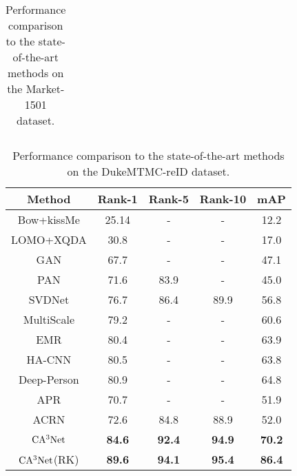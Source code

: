 \documentclass[sigconf]{acmart}
\begin{document}
\begin{table}[htbp]
\begin{center}
\begin{tabular}{|c|c|c|c|c|}
			\hline
		\end{tabular}
	\end{center}
	\caption{Performance comparison to the state-of-the-art methods on the Market-1501 dataset.}
\end{table}\begin{table}[htbp]
	\begin{center}
		\newcommand{\tabincell}[2]{\begin{tabular}{@{}#1@{}}#2\end{tabular}}
		\begin{tabular}{|c|c|c|c|c|}
			\hline
			\textbf{Method}&\textbf{Rank-1}&\textbf{Rank-5}&\textbf{Rank-10}&\textbf{mAP}\\
			\hline
			Bow+kissMe\cite{17}&25.14&-&-&12.2\\
			\hline
			LOMO+XQDA\cite{2}&30.8&-&-&17.0\\
			\hline
			\hline
			GAN\cite{18}&67.7&-&-&47.1\\
			\hline
			PAN\cite{28}&71.6&83.9&-&45.0\\
			\hline
			SVDNet\cite{26}&76.7&86.4&89.9&56.8\\
			\hline
			MultiScale \cite{30}&79.2&-&-&60.6\\
			\hline
			EMR\cite{36}&80.4&-&-&63.9\\
			\hline
			HA-CNN\cite{7}&80.5&-&-&63.8\\
			\hline
			Deep-Person\cite{37}&80.9&-&-&64.8\\
			\hline
			\hline
			APR\cite{12}&70.7&-&-&51.9\\
			\hline
			ACRN\cite{11}&72.6&84.8&88.9&52.0\\
			\hline
			\hline
			$\rm CA^3Net$&\textbf{84.6}&\textbf{92.4}&\textbf{94.9}&\textbf{70.2}\\
			\hline
			$\rm CA^3Net$(RK)&\textbf{89.6}&\textbf{94.1}&\textbf{95.4}&\textbf{86.4}\\
			\hline
		\end{tabular}
	\end{center}
	\caption{Performance comparison to the state-of-the-art methods on the DukeMTMC-reID dataset.}

\end{table}
\end{document}
